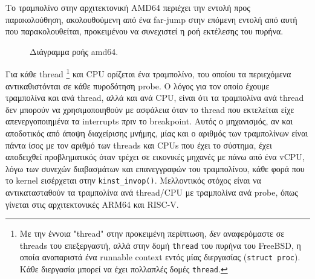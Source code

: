 \documentclass[12pt]{article}
\begin{document}
Το τραμπολίνο στην αρχιτεκτονική AMD64 περιέχει την εντολή προς παρακολούθηση,
ακολουθούμενη από ένα far-jump στην επόμενη εντολή από αυτή που
παρακολουθείται, προκειμένου να συνεχιστεί η ροή εκτέλεσης του πυρήνα.

\begin{figure}[H]
\begin{center}
\caption{Διάγραμμα ροής amd64.}
\label{amd64flow}
\end{center}
\end{figure}

Για κάθε thread
\footnote{
	Με την έννοια "thread" στην προκειμένη περίπτωση, \textit{δεν}
	αναφερόμαστε σε threads του επεξεργαστή, αλλά στην δομή
	\lstinline{thread} του πυρήνα του FreeBSD, η οποία αναπαριστά ένα
	runnable context εντός μίας διεργασίας (\lstinline{struct proc}). Κάθε
	διεργασία μπορεί να έχει πολλαπλές δομές \lstinline{thread}.
}
και CPU ορίζεται ένα τραμπολίνο, του οποίου τα περιεχόμενα αντικαθιστόνται σε
κάθε πυροδότηση probe. Ο λόγος για τον οποίο έχουμε τραμπολίνα και ανά thread,
αλλά και ανά CPU, είναι ότι τα τραμπολίνα ανά thread δεν μπορούν να
χρησιμοποιηθούν με ασφάλεια όταν το thread που εκτελείται είχε απενεργοποιημένα
τα interrupts πριν το breakpoint. Αυτός ο μηχανισμός, αν και αποδοτικός από
άποψη διαχείρισης μνήμης, μίας και ο αριθμός των τραμπολίνων είναι πάντα ίσος
με τον αριθμό των threads και CPUs που έχει το σύστημα, έχει αποδειχθεί
προβληματικός όταν τρέχει σε εικονικές μηχανές με πάνω από ένα vCPU, λόγω των
συνεχών διαβασμάτων και επανεγγραφών του τραμπολίνου, κάθε φορά που το kernel
εισέρχεται στην \lstinline{kinst_invop()}. Μελλοντικός στόχος είναι να
αντικατασταθούν τα τραμπολίνα ανά thread/CPU με τραμπολίνα ανά probe, όπως
γίνεται στις αρχιτεκτονικές ARM64 και RISC-V.
\end{document}
